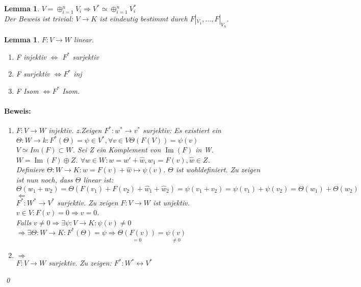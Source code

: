 \documentclass{report}
\DeclareMathOperator{\Ima}{Im}
\theoremstyle{customrem}
\theoremstyle{customdef}
\newtheorem{lemma}[definition]{Lemma}
\renewenvironment{proof}{\paragraph{Beweis: }}{\qed}
\theoremstyle{customenv}
\begin{document}
\begin{lemma}
  \(V = \oplus_{i=1}^n V_i \Rightarrow V^* \simeq \oplus_{i=1}^n V_i^*\)\\
  Der Beweis ist trivial: \(V \to K\) ist eindeutig bestimmt durch \(F |_{V_1},
  \dots, F|_{V_n}\).
\end{lemma}

\begin{lemma}
  \(F : V \to W\) linear.
  \begin{enumerate}
    \item{F injektiv \(\Leftrightarrow\) \(F^*\) surjektiv}
    \item{F surjektiv \(\Leftrightarrow F^*\) inj }
    \item{F Isom \(\Leftrightarrow F^*\) Isom.}
  \end{enumerate}
  \begin{proof}
    \begin{enumerate}
      \item {
        \(F : V \to W\) injektiv. z.Zeigen \(F^* : w^* \to v^*\) surjektiv:
        Es existiert ein \(\Theta : W \to k :
        F^*(\Theta) = \psi \in V^*, \forall v \in V \Theta(F(V)) = \psi(v)\)\\
        \(V \simeq Im(F) \subset W\). Sei Z ein Komplement von \(\Ima(F)\) in W.
        \(W = \Ima(F) \oplus Z\). \(\forall w \in W : w = w' + \hat w, w_1 = F(v),
        \hat w \in Z\).\\
        Definiere \(\Theta : W \to K : w = F(v) + \hat w \mapsto \psi(v)\).
        \(\Theta\) ist wohldefiniert. Zu zeigen ist nun noch, dass \(\Theta\)
        linear ist:\\
        \(\Theta(w_1 + w_2) = \Theta(F(v_1) + F(v_2) + \hat w_1 + \hat w_2)
        = \psi(v_1 + v_2) = \psi(v_1) + \psi(v_2) = \Theta(w_1) + \Theta(w_2)\)\\
        \(\Leftarrow\)\\
        \(F^* : W^* \to V^*\) surjektiv. Zu zeigen \(F : V \to W\) ist unjektiv.
        \(v \in V : F(v) = 0 \Rightarrow v = 0\).\\
        Falls \(v \neq 0 \Rightarrow \exists \psi : V \to K : \psi(v) \neq 0\)\\
        \(\Rightarrow \exists \Theta : W \to K : F^*(\Theta) = \psi \Rightarrow
        \underset{=0}{\Theta(F(v))} = \underset{\neq 0}{\psi(v)}\)
      }
      \item {
        \(\Rightarrow\)\\
        \(F : V \to W\) surjektiv. Zu zeigen: \(F^* : W^* \leftrightarrow V^*\)
}
\end{enumerate}
\end{proof}
\end{lemma}
\end{document}
